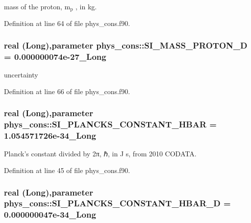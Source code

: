 mass of the proton, m$_{\mbox{p}}$ , in kg. 



Definition at line 64 of file phys\_\-cons.f90.

\hypertarget{namespacephys__cons_a3c37a18a918519962cfc26597082d53d}{
\subsubsection[{SI\_\-MASS\_\-PROTON\_\-D}]{\setlength{\rightskip}{0pt plus 5cm}real (Long),parameter {\bf phys\_\-cons::SI\_\-MASS\_\-PROTON\_\-D} = 0.000000074e-\/27\_\-Long}}
\label{namespacephys__cons_a3c37a18a918519962cfc26597082d53d}


uncertainty 



Definition at line 66 of file phys\_\-cons.f90.

\hypertarget{namespacephys__cons_ab49e79c21c913c5857dedf2c555d2c21}{
\subsubsection[{SI\_\-PLANCKS\_\-CONSTANT\_\-HBAR}]{\setlength{\rightskip}{0pt plus 5cm}real (Long),parameter {\bf phys\_\-cons::SI\_\-PLANCKS\_\-CONSTANT\_\-HBAR} = 1.054571726e-\/34\_\-Long}}
\label{namespacephys__cons_ab49e79c21c913c5857dedf2c555d2c21}


Planck's constant divided by 2π, ℏ, in J s, from 2010 CODATA. 



Definition at line 45 of file phys\_\-cons.f90.

\hypertarget{namespacephys__cons_af8ab82739d58ac3a1e1d9c97d3cfb4da}{
\subsubsection[{SI\_\-PLANCKS\_\-CONSTANT\_\-HBAR\_\-D}]{\setlength{\rightskip}{0pt plus 5cm}real (Long),parameter {\bf phys\_\-cons::SI\_\-PLANCKS\_\-CONSTANT\_\-HBAR\_\-D} = 0.000000047e-\/34\_\-Long}}
\label{namespacephys__cons_af8ab82739d58ac3a1e1d9c97d3cfb4da}


